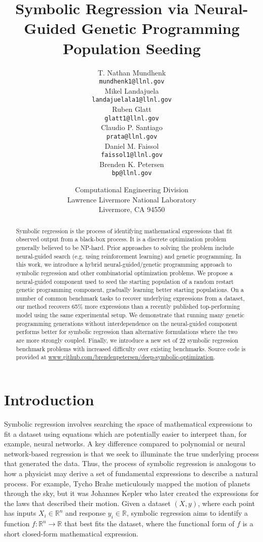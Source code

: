 \documentclass{article}
\title{Symbolic Regression via Neural-Guided Genetic Programming Population Seeding}
\author{
    T. Nathan Mundhenk\\
    \texttt{mundhenk1@llnl.gov} \\
    \And
    Mikel Landajuela \\
    \texttt{landajuelala1@llnl.gov} \\
    \And
    Ruben Glatt \\
    \texttt{glatt1@llnl.gov} \\
    \And
    Claudio P. Santiago \\
    \texttt{prata@llnl.gov} \\
    \And
    Daniel M. Faissol \\
    \texttt{faissol1@llnl.gov} \\
    \And
    Brenden K. Petersen \\
    \texttt{bp@llnl.gov} \\
    \and
    Computational Engineering Division\\
    Lawrence Livermore National Laboratory\\
    Livermore, CA 94550 \\
}
\begin{document}
\maketitle

\begin{abstract}
Symbolic regression is the process of identifying mathematical expressions that fit observed output from a black-box process.
It is a discrete optimization problem generally believed to be NP-hard.
Prior approaches to solving the problem include neural-guided search (e.g. using reinforcement learning) and genetic programming.
In this work, we introduce a hybrid neural-guided/genetic programming approach to symbolic regression and other combinatorial optimization problems.
We propose a neural-guided component used to seed the starting population of a random restart genetic programming component, gradually learning better starting populations.
On a number of common benchmark tasks to recover underlying expressions from a dataset, our method recovers 65\% more expressions than a recently published top-performing model using the same experimental setup.
We demonstrate that running many genetic programming generations without interdependence on the neural-guided component performs better for symbolic regression than alternative formulations where the two are more strongly coupled.
Finally, we introduce a new set of 22 symbolic regression benchmark problems with increased difficulty over existing benchmarks.
Source code is provided at \url{www.github.com/brendenpetersen/deep-symbolic-optimization}.
\end{abstract}

\section{Introduction}
Symbolic regression involves searching the space of mathematical expressions to fit a dataset using equations which are potentially easier to interpret than, for example, neural networks.
A key difference compared to polynomial or neural network-based regression is that we seek to illuminate the true underlying process that generated the data.
Thus, the process of symbolic regression is analogous to how a physicist may derive a set of fundamental expressions to describe a natural process.
For example, Tycho Brahe meticulously mapped the motion of planets through the sky, but it was Johannes Kepler who later created the expressions for the laws that described their motion.
Given a dataset $(X, y)$, where each point has inputs $X_i \in \mathbb{R}^n$ and response $y_i \in \mathbb{R}$, symbolic regression aims to identify a function $f : \mathbb{R}^n \rightarrow \mathbb{R}$ that best fits the dataset, where the functional form of $f$ is a short closed-form mathematical expression.
\end{document}
